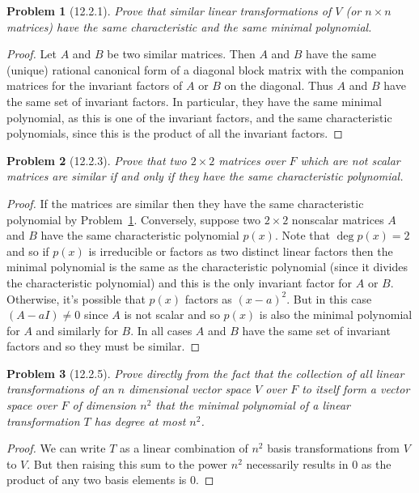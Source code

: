\documentclass{article}
\newtheorem{problem}{Problem}
\begin{document}

\begin{problem}[12.2.1]
\label{similar}
Prove that similar linear transformations of $V$ (or $n \times n$ matrices) have the same characteristic and the same minimal polynomial.
\end{problem}
\begin{proof}
Let $A$ and $B$ be two similar matrices. Then $A$ and $B$ have the same (unique) rational canonical form of a diagonal block matrix with the companion matrices for the invariant factors of $A$ or $B$ on the diagonal. Thus $A$ and $B$ have the same set of invariant factors. In particular, they have the same minimal polynomial, as this is one of the invariant factors, and the same characteristic polynomials, since this is the product of all the invariant factors.
\end{proof}

\begin{problem}[12.2.3]
Prove that two $2 \times 2$ matrices over $F$ which are not scalar matrices are similar if and only if they have the same characteristic polynomial.
\end{problem}
\begin{proof}
If the matrices are similar then they have the same characteristic polynomial by Problem~\ref{similar}. Conversely, suppose two $2 \times 2$ nonscalar matrices $A$ and $B$ have the same characteristic polynomial $p(x)$. Note that $\deg p(x) = 2$ and so if $p(x)$ is irreducible or factors as two distinct linear factors then the minimal polynomial is the same as the characteristic polynomial (since it divides the characteristic polynomial) and this is the only invariant factor for $A$ or $B$. Otherwise, it's possible that $p(x)$ factors as $(x-a)^2$. But in this case $(A-aI) \neq 0$ since $A$ is not scalar and so $p(x)$ is also the minimal polynomial for $A$ and similarly for $B$. In all cases $A$ and $B$ have the same set of invariant factors and so they must be similar.
\end{proof}

\begin{problem}[12.2.5]
Prove directly from the fact that the collection of \emph{all} linear transformations of an $n$ dimensional vector space $V$ over $F$ to itself form a vector space over $F$ of dimension $n^2$ that the minimal polynomial of a linear transformation $T$ has degree at most $n^2$.
\end{problem}
\begin{proof}
We can write $T$ as a linear combination of $n^2$ basis transformations from $V$ to $V$. But then raising this sum to the power $n^2$ necessarily results in $0$ as the product of any two basis elements is $0$.
\end{proof}
\end{document}
